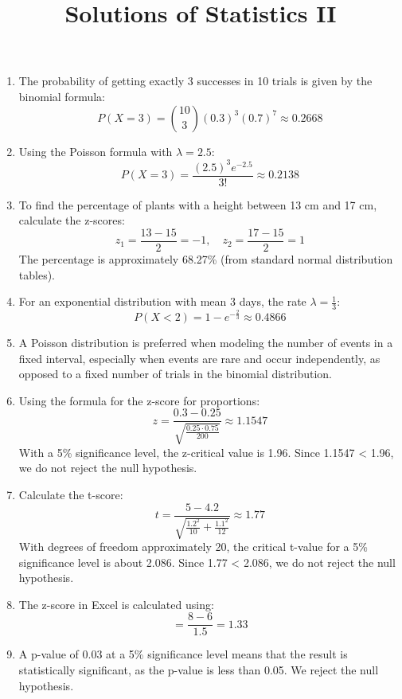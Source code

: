 \documentclass[11pt]{article}
\title{Solutions of Statistics II}
\author{}
\begin{document}
\maketitle
\thispagestyle{fancy}
    
\begin{enumerate}
    \item The probability of getting exactly 3 successes in 10 trials is given by the binomial formula:
    \[
    P(X = 3) = \binom{10}{3} (0.3)^3 (0.7)^{7} \approx 0.2668
    \]

    \item Using the Poisson formula with $\lambda = 2.5$:
    \[
    P(X = 3) = \frac{(2.5)^3 e^{-2.5}}{3!} \approx 0.2138
    \]

    \item To find the percentage of plants with a height between 13 cm and 17 cm, calculate the z-scores:
    \[
    z_1 = \frac{13 - 15}{2} = -1, \quad z_2 = \frac{17 - 15}{2} = 1
    \]
    The percentage is approximately 68.27\% (from standard normal distribution tables).

    \item For an exponential distribution with mean 3 days, the rate $\lambda = \frac{1}{3}$:
    \[
    P(X < 2) = 1 - e^{-\frac{2}{3}} \approx 0.4866
    \]

    \item A Poisson distribution is preferred when modeling the number of events in a fixed interval, especially when events are rare and occur independently, as opposed to a fixed number of trials in the binomial distribution.

    \item Using the formula for the z-score for proportions:
    \[
    z = \frac{0.3 - 0.25}{\sqrt{\frac{0.25 \cdot 0.75}{200}}} \approx 1.1547
    \]
    With a 5\% significance level, the z-critical value is 1.96. Since 1.1547 < 1.96, we do not reject the null hypothesis.

    \item Calculate the t-score:
    \[
    t = \frac{5 - 4.2}{\sqrt{\frac{1.2^2}{10} + \frac{1.1^2}{12}}} \approx 1.77
    \]
    With degrees of freedom approximately 20, the critical t-value for a 5\% significance level is about 2.086. Since 1.77 < 2.086, we do not reject the null hypothesis.

    \item The z-score in Excel is calculated using:
    \[
    = \frac{8 - 6}{1.5} = 1.33
    \]

    \item A p-value of 0.03 at a 5\% significance level means that the result is statistically significant, as the p-value is less than 0.05. We reject the null hypothesis.


\end{enumerate}
\end{document}
